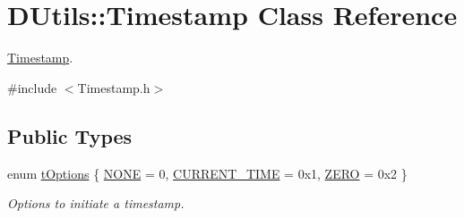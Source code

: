 \hypertarget{class_d_utils_1_1_timestamp}{}\section{D\+Utils\+:\+:Timestamp Class Reference}
\label{class_d_utils_1_1_timestamp}


\mbox{\hyperlink{class_d_utils_1_1_timestamp}{Timestamp}}.  




{\ttfamily \#include $<$Timestamp.\+h$>$}

\subsection*{Public Types}
\begin{DoxyCompactItemize}
\item 
enum \mbox{\hyperlink{class_d_utils_1_1_timestamp_a5a8a3cb7f9e0f73bf11fce42688b06c8}{t\+Options}} \{ \mbox{\hyperlink{class_d_utils_1_1_timestamp_a5a8a3cb7f9e0f73bf11fce42688b06c8a786d448832975701b79c18f24f1d52c9}{N\+O\+NE}} = 0, 
\mbox{\hyperlink{class_d_utils_1_1_timestamp_a5a8a3cb7f9e0f73bf11fce42688b06c8a2b8a10e2984fac4c048daa8af7ceee5e}{C\+U\+R\+R\+E\+N\+T\+\_\+\+T\+I\+ME}} = 0x1, 
\mbox{\hyperlink{class_d_utils_1_1_timestamp_a5a8a3cb7f9e0f73bf11fce42688b06c8a8bb8c1ae23bdd2bbfb578fc27db83d80}{Z\+E\+RO}} = 0x2
 \}
\begin{DoxyCompactList}\small\item\em Options to initiate a timestamp. \end{DoxyCompactList}\end{DoxyCompactItemize}

